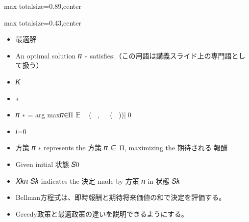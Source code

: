 \begin{minipage}[t]{0.58\textwidth}
\begin{adjustbox}{max totalsize={\textwidth}{0.89\textheight},center}
\begin{minipage}{\textwidth}
\end{minipage}
\end{adjustbox}
\end{minipage}


\clearpage
{}
\begin{minipage}[t]{0.405\textwidth}
\begin{adjustbox}{max totalsize={\textwidth}{0.43\textheight},center}
\begin{minipage}{\textwidth}\scriptsize
{}\begin{itemize}
\item 最適解
\item An optimal solution 𝜋 ∗ satisfies:（この用語は講義スライド上の専門語として扱う）
\item 𝐾
\item ∗
\item 𝜋 ∗ = arg max𝜋∈Π 𝔼 ෍ 𝑅(𝑆𝑖 , 𝑋𝑖𝜋 (𝑆𝑖 ))|𝑆0
\item 𝑖=0
\item 方策 𝜋 ∗ represents the 方策 𝜋 ∈ Π, maximizing the 期待される 報酬
\item Given initial 状態 𝑆0
\item 𝑋𝑘𝜋 𝑆𝑘 indicates the 決定 made by 方策 𝜋 in 状態 𝑆𝑘
\end{itemize}\begin{itemize}
\item Bellman方程式は、即時報酬と期待将来価値の和で決定を評価する。
\item Greedy政策と最適政策の違いを説明できるようにする。
\end{itemize}
\end{minipage}
\end{adjustbox}
\end{minipage}\hfill

